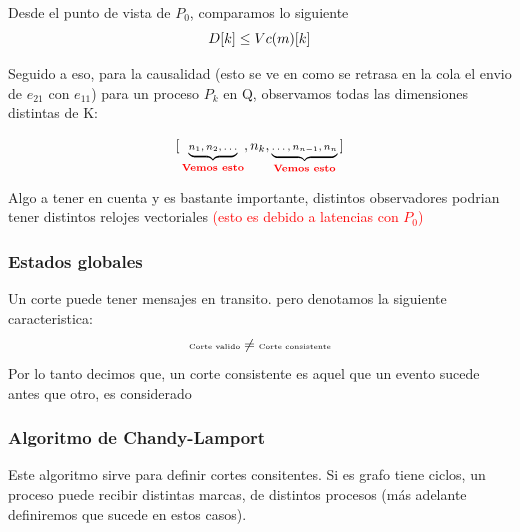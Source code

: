 Desde el punto de vista de $P_0$, comparamos lo siguiente
\[
  \tiny D[k]\leq Vc(m)[k]
\]

Seguido a eso, para la causalidad (esto se ve en como se retrasa en la cola el envio de $e_{21}$ con $e_{11}$) para un proceso $P_k$ en Q, observamos todas las dimensiones distintas de K:

\[
\tiny
  \scriptsize [\,\underbrace{n_1, n_2, \dots}_{\textcolor{red}{\textbf{Vemos esto}}}, 
  n_k , 
  \underbrace{\dots,n_{n-1}, n_{n}}_{\textcolor{red}{\textbf{Vemos esto}}}\,]
\]


Algo a tener en cuenta y es bastante importante, distintos observadores podrian tener distintos relojes vectoriales \textcolor{red}{(esto es debido a latencias con $P_0$)}


\subsubsection{Estados globales}
Un corte puede tener mensajes en transito. pero denotamos la siguiente caracteristica:
\[
  \tiny  \text{Corte valido} \neq \text{Corte consistente}
\]
Por lo tanto decimos que, un corte consistente es aquel que un evento sucede antes que otro, es considerado

\subsubsection{Algoritmo de Chandy-Lamport}
Este algoritmo sirve para definir cortes consitentes. Si es grafo tiene ciclos, un proceso puede recibir distintas marcas, de distintos procesos (más adelante definiremos que sucede en estos casos).


